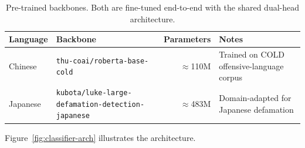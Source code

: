 \documentclass[../CLthesis.tex]{subfiles}
\begin{document}
\begin{table}[htbp]
\centering
\small
\begin{tabularx}{\textwidth}{@{}l X r X@{}}
\toprule
Language & Backbone & Parameters & Notes \\
\midrule
Chinese  & \texttt{thu-coai/roberta-base-cold} \citep{thucoai-roberta-cold} & $\approx$110M & Trained on COLD offensive-language corpus \\ \addlinespace
Japanese & \texttt{kubota/luke-large-defamation\allowbreak -detection-japanese} \citep{yamada2020luke} & $\approx$483M & Domain-adapted for Japanese defamation \\
\bottomrule
\end{tabularx}
\caption{Pre-trained backbones. Both are fine-tuned end-to-end with the shared dual-head architecture.}
\label{tab:backbones}
\end{table}

Figure~\ref{fig:classifier-arch} illustrates the architecture.
\end{document}
